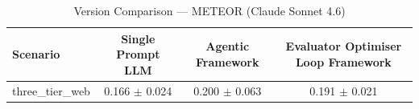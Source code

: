 \begin{table}[htbp]
\centering
\caption{Version Comparison — METEOR (Claude Sonnet 4.6)}
\label{tab:version_meteor_claude}
\begin{tabular}{lccc}
\toprule
Scenario & Single Prompt LLM & Agentic Framework & Evaluator Optimiser Loop Framework \\
\midrule
three\_tier\_web & 0.166 $\pm$ 0.024 & 0.200 $\pm$ 0.063 & 0.191 $\pm$ 0.021 \\
\bottomrule
\end{tabular}
\end{table}